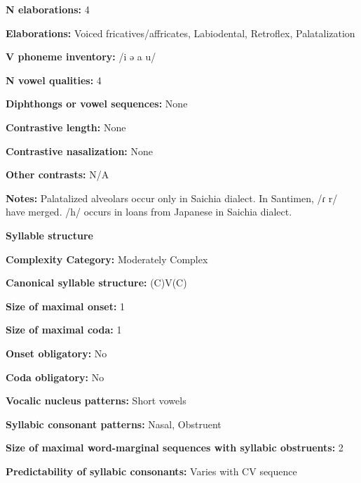 \textbf{N elaborations:} 4



\textbf{Elaborations:} Voiced fricatives/affricates, Labiodental, Retroflex, Palatalization



\textbf{V phoneme inventory:} /i ə a u/



\textbf{N vowel qualities:} 4



\textbf{Diphthongs or vowel sequences:} None



\textbf{Contrastive length:} None



\textbf{Contrastive nasalization:} None



\textbf{Other contrasts:} N/A



\textbf{Notes:} Palatalized alveolars occur only in Saichia dialect. In Santimen, /ɾ r/ have merged. /h/ occurs in loans from Japanese in Saichia dialect.



\textbf{Syllable structure}



\textbf{Complexity Category:} Moderately Complex



\textbf{Canonical syllable structure:} (C)V(C) \citep[31-34]{Chang2006}



\textbf{Size of maximal onset:} 1



\textbf{Size of maximal coda:} 1



\textbf{Onset obligatory:} No



\textbf{Coda obligatory:} No



\textbf{Vocalic nucleus patterns:} Short vowels



\textbf{Syllabic consonant patterns:} Nasal, Obstruent



\textbf{Size of maximal word{}-marginal sequences with syllabic obstruents:} 2



\textbf{Predictability of syllabic consonants:} Varies with CV sequence



